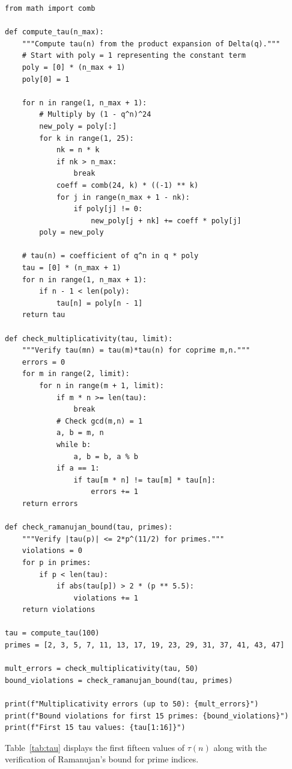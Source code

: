 \documentclass[10pt]{amsart}
\theoremstyle{plain}
\theoremstyle{definition}
\theoremstyle{remark}
\begin{document}
\begin{lstlisting}[label=lst:tau, caption={Computing Ramanujan's tau function and checking prime bounds.}]
from math import comb

def compute_tau(n_max):
    """Compute tau(n) from the product expansion of Delta(q)."""
    # Start with poly = 1 representing the constant term
    poly = [0] * (n_max + 1)
    poly[0] = 1

    for n in range(1, n_max + 1):
        # Multiply by (1 - q^n)^24
        new_poly = poly[:]
        for k in range(1, 25):
            nk = n * k
            if nk > n_max:
                break
            coeff = comb(24, k) * ((-1) ** k)
            for j in range(n_max + 1 - nk):
                if poly[j] != 0:
                    new_poly[j + nk] += coeff * poly[j]
        poly = new_poly

    # tau(n) = coefficient of q^n in q * poly
    tau = [0] * (n_max + 1)
    for n in range(1, n_max + 1):
        if n - 1 < len(poly):
            tau[n] = poly[n - 1]
    return tau

def check_multiplicativity(tau, limit):
    """Verify tau(mn) = tau(m)*tau(n) for coprime m,n."""
    errors = 0
    for m in range(2, limit):
        for n in range(m + 1, limit):
            if m * n >= len(tau):
                break
            # Check gcd(m,n) = 1
            a, b = m, n
            while b:
                a, b = b, a % b
            if a == 1:
                if tau[m * n] != tau[m] * tau[n]:
                    errors += 1
    return errors

def check_ramanujan_bound(tau, primes):
    """Verify |tau(p)| <= 2*p^(11/2) for primes."""
    violations = 0
    for p in primes:
        if p < len(tau):
            if abs(tau[p]) > 2 * (p ** 5.5):
                violations += 1
    return violations

tau = compute_tau(100)
primes = [2, 3, 5, 7, 11, 13, 17, 19, 23, 29, 31, 37, 41, 43, 47]

mult_errors = check_multiplicativity(tau, 50)
bound_violations = check_ramanujan_bound(tau, primes)

print(f"Multiplicativity errors (up to 50): {mult_errors}")
print(f"Bound violations for first 15 primes: {bound_violations}")
print(f"First 15 tau values: {tau[1:16]}")
\end{lstlisting}

Table~\ref{tab:tau} displays the first fifteen values of $\tau(n)$
along with the verification of Ramanujan's bound for prime indices.
\end{document}
